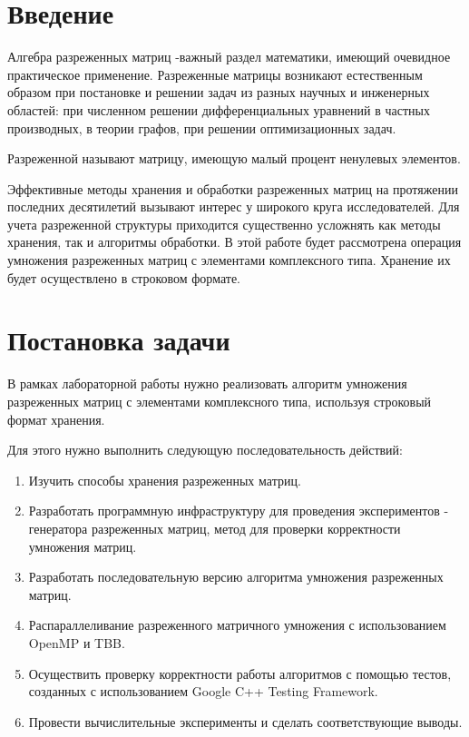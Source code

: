 \documentclass{report}
\begin{document}
\setcounter{page}{2}

\tableofcontents
\newpage

\section*{Введение}
Алгебра разреженных матриц -важный раздел математики, имеющий очевидное практическое применение. Разреженные матрицы возникают естественным образом при постановке и решении задач из разных научных и инженерных областей: при численном решении дифференциальных уравнений в частных производных, в теории графов, при решении оптимизационных задач.

\par Разреженной называют матрицу, имеющую малый процент ненулевых элементов.

\par Эффективные методы хранения и обработки разреженных матриц на протяжении последних десятилетий вызывают интерес у широкого круга исследователей.  Для учета разреженной структуры приходится существенно усложнять как методы хранения, так и алгоритмы обработки. В этой работе будет рассмотрена операция умножения разреженных матриц с элементами комплексного типа. Хранение их будет осуществлено в строковом формате.

\newpage

\section*{Постановка задачи}
В рамках лабораторной работы нужно реализовать алгоритм умножения разреженных матриц с элементами комплексного типа, используя строковый формат хранения.

\par Для этого нужно выполнить следующую последовательность действий:

\begin{enumerate}
\item Изучить способы хранения разреженных матриц.
\item Разработать программную инфраструктуру для проведения экспериментов - генератора разреженных матриц, метод для проверки корректности умножения матриц.
\item Разработать последовательную версию алгоритма умножения разреженных матриц.
\item Распараллеливание разреженного матричного умножения с использованием OpenMP и TBB.
\item Осуществить проверку корректности работы алгоритмов с помощью тестов, созданных с использованием Google C++ Testing Framework.
\item Провести вычислительные эксперименты и сделать соответствующие выводы.
\end{enumerate}
\newpage
\end{document}
